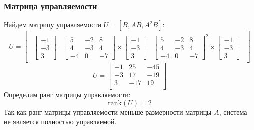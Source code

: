 \subsubsection{Матрица управляемости}
Найдем матрицу управляемости $U = [B, AB, A^2B]$:
\begin{equation}
    U = \begin{bmatrix} 
        \begin{array}{c|c|c}
            \begin{bmatrix}
                -1 \\
                -3 \\
                3
            \end{bmatrix} & 
            \begin{bmatrix}
                5 & -2 & 8 \\
                4 & -3 & 4 \\
                -4 & 0 & -7
            \end{bmatrix} \times 
            \begin{bmatrix}
                -1 \\
                -3 \\
                3
            \end{bmatrix} &
            \begin{bmatrix}
                5 & -2 & 8 \\
                4 & -3 & 4 \\
                -4 & 0 & -7
            \end{bmatrix}^2 \times
            \begin{bmatrix}
                -1 \\
                -3 \\
                3
            \end{bmatrix}
        \end{array}   
    \end{bmatrix}
\end{equation}
\begin{equation}
    U = \begin{bmatrix}
    -1 & 25 & -45 \\ 
    -3 & 17 & -19 \\ 
    3 & -17 & 19 \\ 
    \end{bmatrix}
\end{equation}
Определим ранг матрицы управляемости:
\begin{equation}
    \text{rank}(U) = 2
\end{equation}
Так как ранг матрицы управляемости меньше размерности матрицы $A$, система не является полностью управляемой. 

